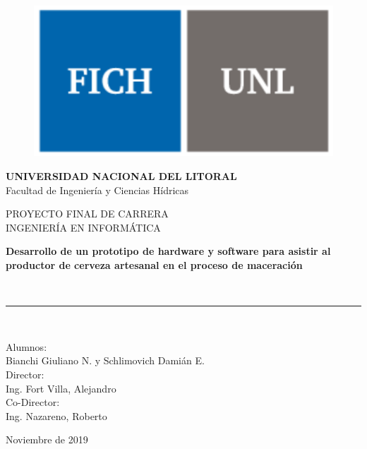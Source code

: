 \begin{titlepage}
	\cleardoublepage
	\frontmatter
	\begin{center}
		\begin{figure}
			\centerline{\includegraphics[scale=0.75]{fichunl.pdf}}
			\label{logo}
		\end{figure}
		\begin{Large}
			\textbf{UNIVERSIDAD NACIONAL DEL LITORAL} \\
			Facultad de Ingeniería y Ciencias Hídricas\\
			\vspace*{1cm}
		\end{Large}
		\vspace*{0.5cm}
		PROYECTO FINAL DE CARRERA\\
		INGENIERÍA EN INFORMÁTICA\\
		\vspace*{1.5cm}
		\begin{Large}
			\textbf{Desarrollo de un prototipo de hardware y software para asistir al productor de cerveza artesanal en el proceso de maceración}
		\end{Large}
		\\
		\vspace*{1cm}
		\rule{100mm}{0.1mm}\\
		\vspace*{1.5cm}
		\begin{large}
			Alumnos: \\
			Bianchi Giuliano N. y Schlimovich Damián E.\\
			\vspace*{0.5cm}
			Director: \\
			Ing. Fort Villa, Alejandro   \\
			\vspace*{0.5cm}
			Co-Director: \\
			Ing. Nazareno, Roberto\\
		\end{large}
		\vspace*{2.5cm}
		\begin{center}
			Noviembre de 2019\textsl{}
		\end{center}
	\end{center}
\end{titlepage}